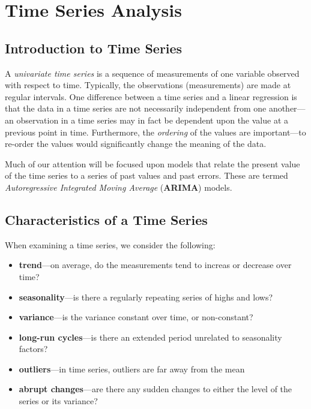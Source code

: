 \documentclass[12pt]{article}
\begin{document}
\section{Time Series Analysis}
\subsection{Introduction to Time Series}
A \textit{univariate time series} is a sequence of measurements of one variable observed with respect to time. Typically, the observations (measurements) are made at regular intervals. One difference between a time series and a linear regression is that the data in a time series are not necessarily independent from one another---an observation in a time series may in fact be dependent upon the value at a previous point in time. Furthermore, the \textit{ordering} of the values are important---to re-order the values would significantly change the meaning of the data.

Much of our attention will be focused upon models that relate the present value of the time series to a series of past values and past errors. These are termed \textit{Autoregressive Integrated Moving Average} (\textbf{ARIMA}) models.

\subsection{Characteristics of a Time Series}
When examining a time series, we consider the following:
\begin{itemize}
\item \textbf{trend}---on average, do the measurements tend to increas or decrease over time?
\item \textbf{seasonality}---is there a regularly repeating series of highs and lows?
\item \textbf{variance}---is the variance constant over time, or non-constant?
\item \textbf{long-run cycles}---is there an extended period unrelated to seasonality factors?
\item \textbf{outliers}---in time series, outliers are far away from the mean
\item \textbf{abrupt changes}---are there any sudden changes to either the level of the series or its variance?
\end{itemize}
\end{document}
